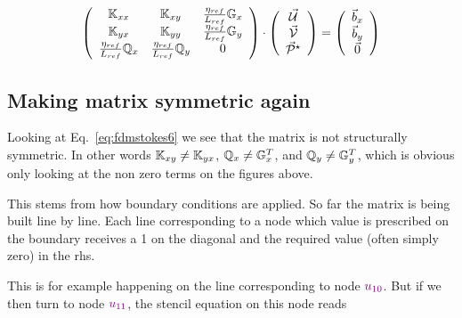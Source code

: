 \begin{equation}
\left(
\begin{array}{ccc}
{\mathbb{K}}_{xx} & {\mathbb{K}}_{xy} & \frac{\eta_{ref}}{L_{ref}} {\mathbb{G}}_x \\
{\mathbb{K}}_{yx} & {\mathbb{K}}_{yy} & \frac{\eta_{ref}}{L_{ref}} {\mathbb{G}}_y \\
\frac{\eta_{ref}}{L_{ref}} {\mathbb{Q}}_x & \frac{\eta_{ref}}{L_{ref}} {\mathbb{Q}}_y & 0
\end{array}
\right)
\cdot
\left(
\begin{array}{c}
\vec{\cal U} \\
\vec{\cal V} \\
\vec{\cal P}^\star
\end{array}
\right)
=
\left(
\begin{array}{c}
\vec{b}_x \\
\vec{b}_y \\
\vec{0}
\end{array}
\right)
\label{eq:fdmstokes7}
\end{equation}


















\subsection{Making matrix symmetric again}

Looking at Eq.~\eqref{eq:fdmstokes6} we see that the matrix is 
not structurally symmetric. In other words ${\mathbb{K}}_{xy} \neq {\mathbb{K}}_{yx}$, 
${\mathbb{Q}}_x \neq {\mathbb{G}}_x^T$, and ${\mathbb{Q}}_y \neq {\mathbb{G}}_y^T$, which is obvious only 
looking at the non zero terms on the figures above. 

This stems from how boundary conditions are applied. So far the matrix 
is being built line by line.
Each line corresponding to a node which value is prescribed on the 
boundary receives a 1 on the diagonal and the required value 
(often simply zero) in the rhs.

This is for example happening on the line corresponding to node 
${\color{violet} u_{10}}$. 
But if we then turn to node ${\color{violet} u_{11}}$, the stencil 
equation on this node reads


